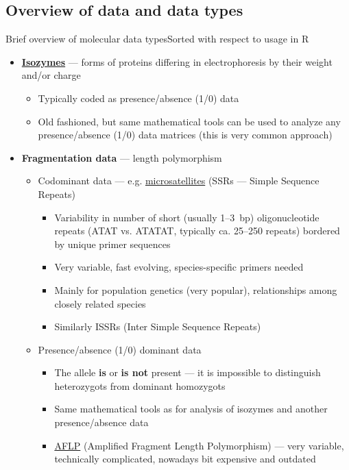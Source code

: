 \documentclass[compress, xelatex, 11pt, xcolor=svgnames, aspectratio=169,
	hyperref={
		bookmarks=true,
		unicode=true,
		colorlinks=true,
		pdftitle={Molecular data in R},
		plainpages=false,
		pdfauthor={Vojtech Zeisek},
		pdfsubject={Course about phylogeny and evolution in R},
		pdfcreator={XeLaTeX},
		pdfkeywords={R, evolution, phylogeny, molecular data},
		linkcolor=Crimson, %
		anchorcolor=Magenta, %
		citecolor=Magenta, %
		filecolor=Magenta, %
		menucolor=Magenta, %
		urlcolor=DodgerBlue, %
		},
	url={hyphens, lowtilde} %
	]{beamer}
\begin{document}
\subsection[Overview]{Overview of data and data types}

\begin{frame}[allowframebreaks]{Brief overview of molecular data types}{Sorted with respect to usage in R}
	\begin{itemize}
		\item \textbf{\href{https://en.wikipedia.org/wiki/Isozyme}{Isozymes}} --- forms of proteins differing in electrophoresis by their weight and/or charge
		\begin{itemize}
			\item Typically coded as presence/absence (1/0) data
			\item Old fashioned, but same mathematical tools can be used to analyze any presence/absence (1/0) data matrices (this is very common approach)
		\end{itemize}
		\item \textbf{Fragmentation data} --- length polymorphism
		\begin{itemize}
			\item Codominant data --- e.g. \href{https://en.wikipedia.org/wiki/Microsatellite}{microsatellites} (SSRs --- Simple Sequence Repeats)
			\begin{itemize}
				\item Variability in number of short (usually 1--3~bp) oligonucleotide repeats (ATAT vs. ATATAT, typically ca. 25--250 repeats) bordered by unique primer sequences
				\item Very variable, fast evolving, species-specific primers needed
				\item Mainly for population genetics (very popular), relationships among closely related species
				\item Similarly ISSRs (Inter Simple Sequence Repeats)
			\end{itemize}
			\item Presence/absence (1/0) dominant data
			\begin{itemize}
				\item The allele \textbf{is} or \textbf{is not} present  --- it is impossible to distinguish heterozygots from dominant homozygots
				\item Same mathematical tools as for analysis of isozymes and another presence/absence data
				\item \href{https://en.wikipedia.org/wiki/Amplified_fragment_length_polymorphism}{AFLP} (Amplified Fragment Length Polymorphism) --- very variable, technically complicated, nowadays bit expensive and outdated

\end{itemize}
\end{itemize}
\end{itemize}
\end{frame}
\end{document}
